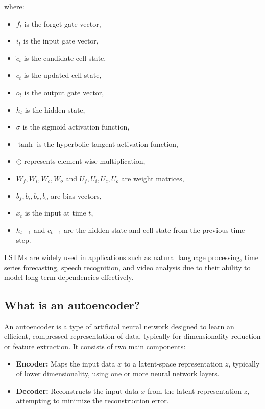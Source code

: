where:
\begin{itemize}
    \item \( f_t \) is the forget gate vector,
    \item \( i_t \) is the input gate vector,
    \item \( \tilde{c}_t \) is the candidate cell state,
    \item \( c_t \) is the updated cell state,
    \item \( o_t \) is the output gate vector,
    \item \( h_t \) is the hidden state,
    \item \( \sigma \) is the sigmoid activation function,
    \item \( \tanh \) is the hyperbolic tangent activation function,
    \item \( \odot \) represents element-wise multiplication,
    \item \( W_f, W_i, W_c, W_o \) and \( U_f, U_i, U_c, U_o \) are weight matrices,
    \item \( b_f, b_i, b_c, b_o \) are bias vectors,
    \item \( x_t \) is the input at time \( t \),
    \item \( h_{t-1} \) and \( c_{t-1} \) are the hidden state and cell state from the previous time step.
\end{itemize}

LSTMs are widely used in applications such as natural language processing, time series forecasting, speech recognition, and video analysis due to their ability to model long-term dependencies effectively.

\subsection{What is an autoencoder?}

An autoencoder is a type of artificial neural network designed to learn an efficient, compressed representation of data, typically for dimensionality reduction or feature extraction. It consists of two main components:

\begin{itemize}
    \item \textbf{Encoder:} Maps the input data \( x \) to a latent-space representation \( z \), typically of lower dimensionality, using one or more neural network layers.
    \item \textbf{Decoder:} Reconstructs the input data \( x \) from the latent representation \( z \), attempting to minimize the reconstruction error.
\end{itemize}

